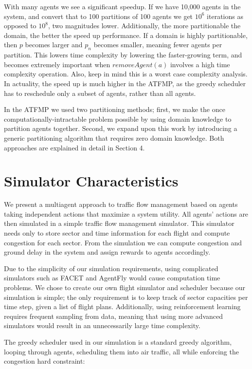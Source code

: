 \documentclass[onehalf,11pt]{beavtex}
\begin{document}
With many agents we see a significant speedup. If we have 10,000 agents in the system, and convert that to 100 partitions of 100 agents we get $10^6$ iterations as opposed to $10^8$, two magnitudes lower. Additionally, the more partitionable the domain, the better the speed up performance. If a domain is highly partitionable, then $p$ becomes larger and $p_n$ becomes smaller, meaning fewer agents per partition. This lowers time complexity by lowering the faster-growing term, and becomes extremely important when $removeAgent(a)$ involves a high time complexity operation. Also, keep in mind this is a worst case complexity analysis. In actuality, the speed up is much higher in the ATFMP, as the greedy scheduler has to reschedule only a subset of agents, rather than all agents.

In the ATFMP we used two partitioning methods; first, we make the once computationally-intractable problem possible by using domain knowledge to partition agents together. Second, we expand upon this work by introducing a generic partitioning algorithm that requires zero domain knowledge. Both approaches are explained in detail in Section 4.

\section{Simulator Characteristics}
We present a multiagent approach to traffic flow management based on agents taking independent actions that maximize a system utility. All agents' actions are then simulated in a simple traffic flow management simulator. This simulator needs only to store sector and time information for each flight and compute congestion for each sector. From the simulation we can compute congestion and ground delay in the system and assign rewards to agents accordingly.

Due to the simplicity of our simulation requirements, using complicated simulators such as FACET \cite{FACET} and AgentFly \cite{Sislak:2008:AMA:1402744.1402755} would cause computation time problems. We chose to create our own flight simulator and scheduler because our simulation is simple; the only requirement is to keep track of sector capacities per time step, given a list of flight plans. Additionally, using reinforcement learning requires frequent sampling from data, meaning that using more advanced simulators would result in an unnecessarily large time complexity.

The greedy scheduler used in our simulation is a standard greedy algorithm, looping through agents, scheduling them into air traffic, all while enforcing the congestion hard constraint: 
\end{document}

